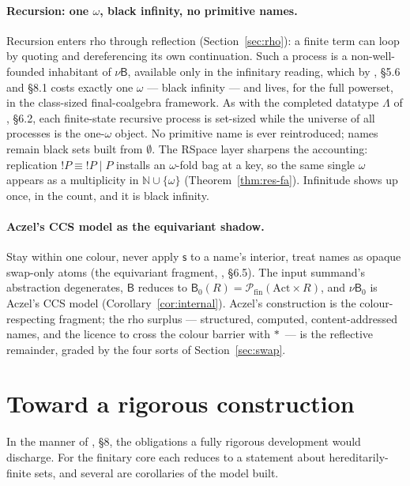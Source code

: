 \documentclass[11pt]{article}
\newcommand{\swp}{\mathsf{s}}                  %
\newcommand{\Par}{\mathbin{\mid}}
\newcommand{\drp}[1]{{\ast}#1}
\newcommand{\Pfin}{\mathcal{P}_{\mathrm{fin}}}
\newcommand{\B}{\mathsf{B}}
\newcommand{\scong}{\equiv}
\theoremstyle{plain}
\theoremstyle{definition}
\begin{document}
\paragraph{Recursion: one $\omega$, black infinity, no primitive names.}
Recursion enters rho through reflection (Section~\ref{sec:rho}): a finite term can
loop by quoting and dereferencing its own continuation. Such a process is a
non-well-founded inhabitant of $\nu\B$, available only in the infinitary reading,
which by \cite{knot}, \S5.6 and \S8.1 costs exactly one $\omega$ --- black
infinity --- and lives, for the full powerset, in the class-sized final-coalgebra
framework. As with the completed datatype $\Lambda$ of \cite{knot}, \S6.2, each
finite-state recursive process is set-sized while the universe of all processes is
the one-$\omega$ object. No primitive name is ever reintroduced; names remain black
sets built from $\emptyset$. The RSpace layer sharpens the accounting: replication
$!P\scong{!P}\Par P$ installs an $\omega$-fold bag at a key, so the same single
$\omega$ appears as a multiplicity in $\mathbb N\cup\{\omega\}$
(Theorem~\ref{thm:res-fa}). Infinitude shows up once, in the count, and it is black
infinity.

\paragraph{Aczel's CCS model as the equivariant shadow.}
Stay within one colour, never apply $\swp$ to a name's interior, treat names as
opaque swap-only atoms (the equivariant fragment, \cite{knot}, \S6.5). The input
summand's abstraction degenerates, $\B$ reduces to $\B_0(R)=\Pfin(\mathrm{Act}\times R)$,
and $\nu{\B_0}$ is Aczel's CCS model (Corollary~\ref{cor:internal}). Aczel's
construction is the colour-respecting fragment; the rho surplus --- structured,
computed, content-addressed names, and the licence to cross the colour barrier
with $\drp{\,}$ --- is the reflective remainder, graded by the four sorts of
Section~\ref{sec:swap}.

\section{Toward a rigorous construction}\label{sec:obligations}

In the manner of \cite{knot}, \S8, the obligations a fully rigorous development
would discharge. For the finitary core each reduces to a statement about
hereditarily-finite sets, and several are corollaries of the model built.
\end{document}
